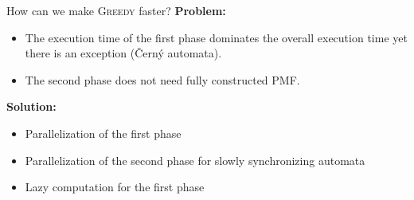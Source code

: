 \documentclass{beamer}
\begin{document}
\begin{frame}{How can we make \textsc{Greedy} faster?}
	\textbf{Problem:}	
	\begin{itemize}
		\item  The execution time of the first phase dominates the overall execution time yet there is an exception (\v{C}ern\'y automata).
		\item The second phase does not need fully constructed PMF.
	\end{itemize}
	\textbf{Solution:}
	\begin{itemize}
		\item Parallelization of the first phase
		\item Parallelization of the second phase for slowly synchronizing automata
		\item Lazy computation for the first phase
	\end{itemize}
\end{frame}
\end{document}
